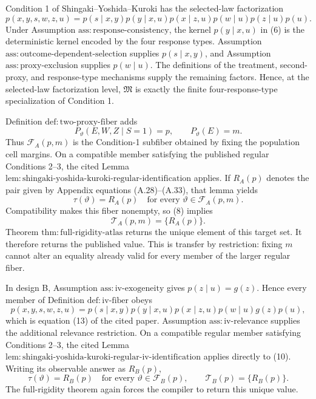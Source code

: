 Condition 1 of Shingaki--Yoshida--Kuroki has the selected-law factorization
\[
 p(x,y,s,w,z,u)
 =p(s\mid x,y)p(y\mid x,u)p(x\mid z,u)
   p(w\mid u)p(z\mid u)p(u).                              \tag{6}
\]
Under Assumption \(\mathrm{ass{:}response\text{-}consistency}\), the kernel \(p(y\mid x,u)\) in (6) is the deterministic kernel encoded by the four response types.  Assumption \(\mathrm{ass{:}outcome\text{-}dependent\text{-}selection}\) supplies \(p(s\mid x,y)\), and Assumption \(\mathrm{ass{:}proxy\text{-}exclusion}\) supplies \(p(w\mid u)\).  The definitions of the treatment, second-proxy, and response-type mechanisms supply the remaining factors.  Hence, at the selected-law factorization level, \(\mathfrak M\) is exactly the finite four-response-type specialization of Condition 1.

Definition \(\mathrm{def{:}two\text{-}proxy\text{-}fiber}\) adds
\[
 P_{\vartheta}(E,W,Z\mid S=1)=p,
 \qquad
 P_{\vartheta}(E)=m.                                      \tag{7}
\]
Thus \(\mathcal F_A(p,m)\) is the Condition-1 subfiber obtained by fixing the population cell margins.  On a compatible member satisfying the published regular Conditions 2--3, the cited Lemma \(\mathrm{lem{:}shingaki\text{-}yoshida\text{-}kuroki\text{-}regular\text{-}identification}\) applies.  If \(R_A(p)\) denotes the pair given by Appendix equations (A.28)--(A.33), that lemma yields
\[
 \tau(\vartheta)=R_A(p)
 \quad\text{for every }\vartheta\in\mathcal F_A(p,m).    \tag{8}
\]
Compatibility makes this fiber nonempty, so (8) implies
\[
 \mathcal T_A(p,m)=\{R_A(p)\}.                            \tag{9}
\]
Theorem \(\mathrm{thm{:}full\text{-}rigidity\text{-}atlas}\) returns the unique element of this target set.  It therefore returns the published value.  This is transfer by restriction: fixing \(m\) cannot alter an equality already valid for every member of the larger regular fiber.

In design B, Assumption \(\mathrm{ass{:}iv\text{-}exogeneity}\) gives \(p(z\mid u)=g(z)\).  Hence every member of Definition \(\mathrm{def{:}iv\text{-}fiber}\) obeys
\[
 p(x,y,s,w,z,u)
 =p(s\mid x,y)p(y\mid x,u)p(x\mid z,u)
   p(w\mid u)g(z)p(u),                                    \tag{10}
\]
which is equation (13) of the cited paper.  Assumption \(\mathrm{ass{:}iv\text{-}relevance}\) supplies the additional relevance restriction.  On a compatible regular member satisfying Conditions 2--3, the cited Lemma \(\mathrm{lem{:}shingaki\text{-}yoshida\text{-}kuroki\text{-}regular\text{-}iv\text{-}identification}\) applies directly to (10).  Writing its observable answer as \(R_B(p)\),
\[
 \tau(\vartheta)=R_B(p)
 \quad\text{for every }\vartheta\in\mathcal F_B(p),
 \qquad
 \mathcal T_B(p)=\{R_B(p)\}.                             \tag{11}
\]
The full-rigidity theorem again forces the compiler to return this unique value.

